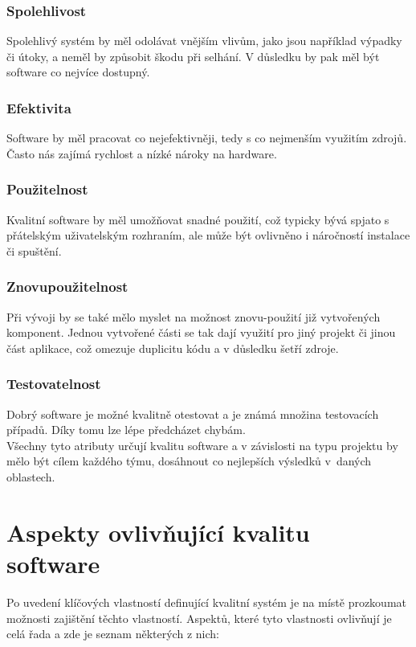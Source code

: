 		\subsubsection{Spolehlivost}
			Spolehlivý systém by měl odolávat vnějším vlivům, jako jsou například výpadky či útoky, a neměl by způsobit škodu při selhání. V důsledku by pak měl být software co nejvíce dostupný.
		
		\subsubsection{Efektivita}
			Software by měl pracovat co nejefektivněji, tedy s co nejmenším využitím zdrojů. Často nás zajímá rychlost a nízké nároky na hardware.
		
		\subsubsection{Použitelnost}
			Kvalitní software by měl umožňovat snadné použití, což typicky bývá spjato s přátelským uživatelským rozhraním, ale může být ovlivněno i náročností instalace či spuštění.
		
		\subsubsection{Znovupoužitelnost}
			Při vývoji by se také mělo myslet na možnost znovu-použití již vytvořených komponent. Jednou vytvořené části se tak dají využití pro jiný projekt či jinou část aplikace, což omezuje duplicitu kódu a v důsledku šetří zdroje.
		
		\subsubsection{Testovatelnost}
			Dobrý software je možné kvalitně otestovat a je známá množina testovacích případů. Díky tomu lze lépe předcházet chybám.\\

Všechny tyto atributy určují kvalitu software a v závislosti na typu projektu by mělo být cílem každého týmu, dosáhnout co nejlepších výsledků v~daných oblastech. 


\section{Aspekty ovlivňující kvalitu software}
Po uvedení klíčových vlastností definující kvalitní systém je na místě prozkoumat možnosti zajištění těchto vlastností. Aspektů, které tyto vlastnosti ovlivňují je celá řada a zde je seznam některých z nich:


